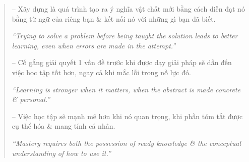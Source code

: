 \documentclass{article}
\begin{document}
\begin{enumerate}
\begin{quotation}
		-- Xây dựng là quá trình tạo ra ý nghĩa vật chất mới bằng cách diễn đạt nó bằng từ ngữ của riêng bạn \& kết nối nó với những gì bạn đã biết.

		{\it``Trying to solve a problem before being taught the solution leads to better learning, even when errors are made in the attempt.''}

		-- Cố gắng giải quyết 1 vấn đề trước khi được dạy giải pháp sẽ dẫn đến việc học tập tốt hơn, ngay cả khi mắc lỗi trong nỗ lực đó.

		{\it``Learning is stronger when it matters, when the abstract is made concrete \& personal.''}

		-- Việc học tập sẽ mạnh mẽ hơn khi nó quan trọng, khi phần tóm tắt được cụ thể hóa \& mang tính cá nhân.

		{\it``Mastery requires both the possession of ready knowledge \& the conceptual understanding of how to use it.''}


\end{quotation}
\end{enumerate}
\end{document}
